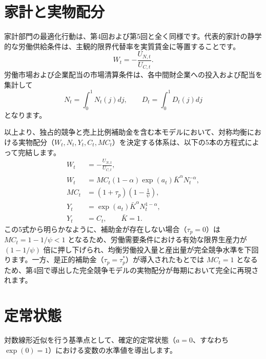 \documentclass[
  japanese,
  lualatex,
  ja=standard,
  12pt,
  a4paper]{ltjsarticle}
\begin{document}
\section{家計と実物配分}\label{ux5bb6ux8a08ux3068ux5b9fux7269ux914dux5206}

家計部門の最適化行動は、第4回および第5回と全く同様です。代表的家計の静学的な労働供給条件は、主観的限界代替率を実質賃金に等置することです。
\[
W_t = -\frac{U_{N,t}}{U_{C,t}}.
\]
労働市場および企業配当の市場清算条件は、各中間財企業への投入および配当を集計して
\[
N_t = \int_0^1 N_t(j) dj, \qquad D_t = \int_0^1 D_t(j) dj
\] となります。

以上より、独占的競争と売上比例補助金を含む本モデルにおいて、対称均衡における実物配分（\(W_t, N_t, Y_t, C_t, MC_t\)）を決定する体系は、以下の5本の方程式によって完結します。
\[
\begin{aligned}
W_t &= -\frac{U_{N,t}}{U_{C,t}},\\
W_t &= MC_t (1-\alpha) \exp(a_t) \bar{K}^\alpha N_t^{-\alpha},\\
MC_t &= (1+\tau_p) \left( 1 - \frac{1}{\psi} \right),\\
Y_t &= \exp(a_t) \bar{K}^\alpha N_t^{1-\alpha},\\
Y_t &= C_t, \qquad \bar{K}=1.
\end{aligned}
\] この5式から明らかなように、補助金が存在しない場合（\(\tau_p = 0\)）は
\(MC_t = 1 - 1/\psi < 1\)
となるため、労働需要条件における有効な限界生産力が \((1-1/\psi)\)
倍に押し下げられ、均衡労働投入量と産出量が完全競争水準を下回ります。一方、是正的補助金（\(\tau_p = \tau_p^*\)）が導入されたもとでは
\(MC_t = 1\)
となるため、第4回で導出した完全競争モデルの実物配分が毎期において完全に再現されます。

\section{定常状態}\label{ux5b9aux5e38ux72b6ux614b}

対数線形近似を行う基準点として、確定的定常状態（\(a=0\)、すなわち
\(\exp(0)=1\)）における変数の水準値を導出します。
\end{document}
